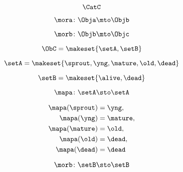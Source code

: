 \begin{forslides}
        
         \begin{equation}
            \label{eq:74}
            \CatC
        \end{equation}
        
        
         \begin{equation}
            \label{eq:75}
            \mora\colon \Obja \mto \Objb
        \end{equation}
        
        
               \begin{equation}
            \label{eq:76}
            \morb\colon \Objb \mto \Objc
        \end{equation}
        
        
         \begin{equation}
            \label{eq:77}
            \ObC = \makeset{ \setA, \setB }
        \end{equation}
        
        
         \begin{equation}
            \label{eq:78}
            \setA = \makeset{ \sprout, \yng, \mature, \old, \dead }
        \end{equation}
        
        
         \begin{equation}
            \label{eq:79}
            \setB = \makeset{ \alive, \dead }
        \end{equation}
        
        
         \begin{equation}
            \label{eq:80}
            \mapa \colon \setA \sto \setA
        \end{equation}
        
        
         \begin{equation}
            \label{eq:81}
            \begin{aligned}
            \mapa(\sprout) & =  \yng, \\
            \mapa(\yng)    & =  \mature, \\
            \mapa(\mature) & =  \old, \\
            \mapa( \old)   & = \dead, \\
            \mapa(\dead)   & = \dead
        \end{aligned}
        \end{equation}
        
        
         \begin{equation}
            \label{eq:82}
            \morb \colon \setB \sto \setB
        \end{equation}
        

\end{forslides}
